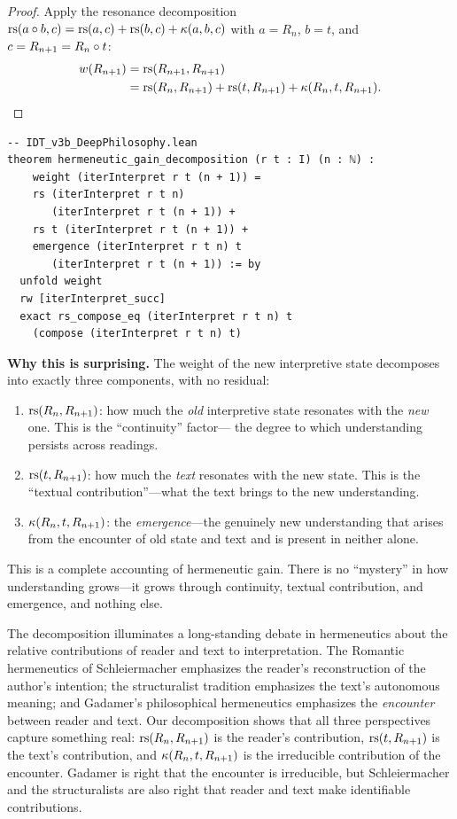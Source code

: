\begin{proof}
Apply the resonance decomposition $\mathrm{rs}(a \circ b, c) = \mathrm{rs}(a,c) +
\mathrm{rs}(b,c) + \kappa(a,b,c)$ with $a = R_n$, $b = t$, and
$c = R_{n+1} = R_n \circ t$:
\begin{align*}
w(R_{n+1}) &= \mathrm{rs}(R_{n+1}, R_{n+1}) \\
&= \mathrm{rs}(R_n, R_{n+1}) + \mathrm{rs}(t, R_{n+1}) + \kappa(R_n, t, R_{n+1}).
\qedhere
\end{align*}
\end{proof}

\begin{lstlisting}
-- IDT_v3b_DeepPhilosophy.lean
theorem hermeneutic_gain_decomposition (r t : I) (n : ℕ) :
    weight (iterInterpret r t (n + 1)) =
    rs (iterInterpret r t n)
       (iterInterpret r t (n + 1)) +
    rs t (iterInterpret r t (n + 1)) +
    emergence (iterInterpret r t n) t
       (iterInterpret r t (n + 1)) := by
  unfold weight
  rw [iterInterpret_succ]
  exact rs_compose_eq (iterInterpret r t n) t
    (compose (iterInterpret r t n) t)
\end{lstlisting}

\begin{surprisebox}
\textbf{Why this is surprising.} The weight of the new interpretive
state decomposes into exactly three components, with no residual:
\begin{enumerate}
\item $\mathrm{rs}(R_n, R_{n+1})$: how much the \emph{old} interpretive state
resonates with the \emph{new} one. This is the ``continuity'' factor---
the degree to which understanding persists across readings.
\item $\mathrm{rs}(t, R_{n+1})$: how much the \emph{text} resonates with the
new state. This is the ``textual contribution''---what the text brings
to the new understanding.
\item $\kappa(R_n, t, R_{n+1})$: the \emph{emergence}---the genuinely
new understanding that arises from the encounter of old state and text
and is present in neither alone.
\end{enumerate}
This is a complete accounting of hermeneutic gain. There is no
``mystery'' in how understanding grows---it grows through continuity,
textual contribution, and emergence, and nothing else.
\end{surprisebox}

The decomposition illuminates a long-standing debate in hermeneutics
about the relative contributions of reader and text to interpretation.
The Romantic hermeneutics of Schleiermacher emphasizes the reader's
reconstruction of the author's intention; the structuralist tradition
emphasizes the text's autonomous meaning; and Gadamer's philosophical
hermeneutics emphasizes the \emph{encounter} between reader and text.
Our decomposition shows that all three perspectives capture something
real: $\mathrm{rs}(R_n, R_{n+1})$ is the reader's contribution,
$\mathrm{rs}(t, R_{n+1})$ is the text's contribution, and
$\kappa(R_n, t, R_{n+1})$ is the irreducible contribution of the
encounter. Gadamer is right that the encounter is irreducible, but
Schleiermacher and the structuralists are also right that reader and
text make identifiable contributions.

